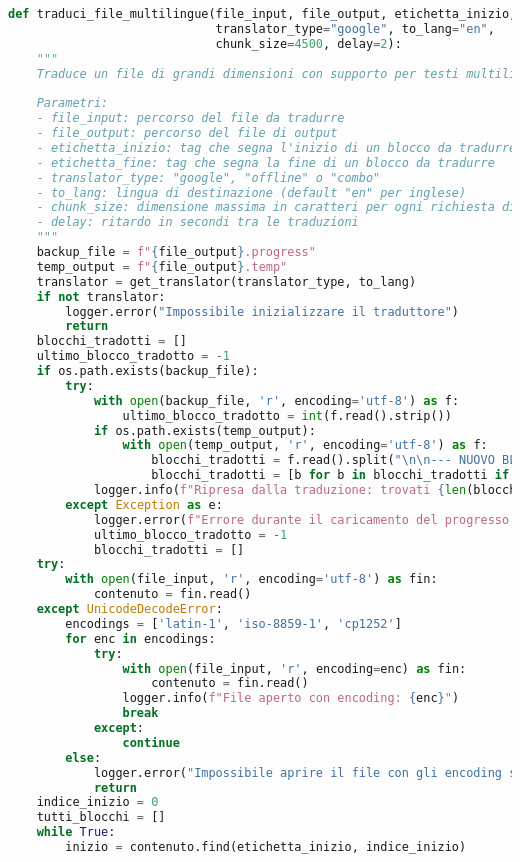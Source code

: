 \documentclass[a4paper,12pt]{article}
\begin{document}
\begin{lstlisting}[language=Python, caption=Versione 1.0 del traduttore]
def traduci_file_multilingue(file_input, file_output, etichetta_inizio, etichetta_fine, 
                             translator_type="google", to_lang="en",
                             chunk_size=4500, delay=2):
    """
    Traduce un file di grandi dimensioni con supporto per testi multilingue.
    
    Parametri:
    - file_input: percorso del file da tradurre
    - file_output: percorso del file di output
    - etichetta_inizio: tag che segna l'inizio di un blocco da tradurre
    - etichetta_fine: tag che segna la fine di un blocco da tradurre
    - translator_type: "google", "offline" o "combo"
    - to_lang: lingua di destinazione (default "en" per inglese)
    - chunk_size: dimensione massima in caratteri per ogni richiesta di traduzione
    - delay: ritardo in secondi tra le traduzioni
    """
    backup_file = f"{file_output}.progress"
    temp_output = f"{file_output}.temp"
    translator = get_translator(translator_type, to_lang)
    if not translator:
        logger.error("Impossibile inizializzare il traduttore")
        return
    blocchi_tradotti = []
    ultimo_blocco_tradotto = -1
    if os.path.exists(backup_file):
        try:
            with open(backup_file, 'r', encoding='utf-8') as f:
                ultimo_blocco_tradotto = int(f.read().strip())
            if os.path.exists(temp_output):
                with open(temp_output, 'r', encoding='utf-8') as f:
                    blocchi_tradotti = f.read().split("\n\n--- NUOVO BLOCCO ---\n\n")
                    blocchi_tradotti = [b for b in blocchi_tradotti if b.strip()]
            logger.info(f"Ripresa dalla traduzione: trovati {len(blocchi_tradotti)} blocchi già tradotti")
        except Exception as e:
            logger.error(f"Errore durante il caricamento del progresso: {e}")
            ultimo_blocco_tradotto = -1
            blocchi_tradotti = []
    try:
        with open(file_input, 'r', encoding='utf-8') as fin:
            contenuto = fin.read()
    except UnicodeDecodeError:
        encodings = ['latin-1', 'iso-8859-1', 'cp1252']
        for enc in encodings:
            try:
                with open(file_input, 'r', encoding=enc) as fin:
                    contenuto = fin.read()
                logger.info(f"File aperto con encoding: {enc}")
                break
            except:
                continue
        else:
            logger.error("Impossibile aprire il file con gli encoding supportati")
            return
    indice_inizio = 0
    tutti_blocchi = []
    while True:
        inizio = contenuto.find(etichetta_inizio, indice_inizio)

\end{lstlisting}
\end{document}
